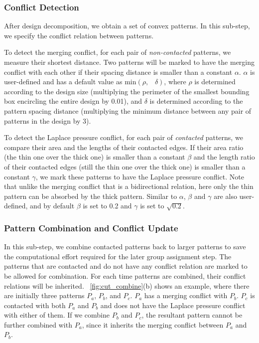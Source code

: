 \subsubsection{Conflict Detection}\label{sec:cd}

After design decomposition, we obtain a set of convex patterns.
In this sub-step, we specify the conflict relation between patterns.

To detect the merging conflict,
for each pair of \textit{non-contacted} patterns,
we measure their shortest distance.
Two patterns will be marked to have the merging conflict with each other
if their spacing distance is smaller than a constant $\alpha$.
$\alpha$ is user-defined and has a default value as 
$\text{min}(\rho,\;\;\; \delta)$,
where $\rho$ is determined according to the design size
(multiplying the perimeter of the smallest bounding box encircling the entire design by 0.01),
and $\delta$ is determined according to the pattern spacing distance
(multiplying the minimum distance between any pair of patterns in the design by 3).

To detect the Laplace pressure conflict,
for each pair of \textit{contacted} patterns,
we compare their area and the lengths of their contacted edges.
If their area ratio (the thin one over the thick one)
is smaller than a constant $\beta$ and the length ratio of their contacted edges (still the thin one over the thick one)
is smaller than a constant $\gamma$,
we mark these patterns to have the Laplace pressure conflict.
Note that unlike the merging conflict that is a bidirectional relation,
here only the thin pattern can be absorbed by the thick pattern.
Similar to $\alpha$, $\beta$ and $\gamma$ are also user-defined,
and by default $\beta$ is set to 0.2 and $\gamma$ is set to $\sqrt{0.2}$.

\subsubsection{Pattern Combination and Conflict Update}

In this sub-step, we combine contacted patterns back to larger patterns to save the computational effort required for the later group assignment step.
The patterns that are contacted and do not have any conflict relation are marked to be allowed for combination.
For each time patterns are combined,
their conflict relations will be inherited.
\figurename~\ref{fig:cut_combine}(b) shows an example,
where there are initially three patterns $P_a$, $P_b$, and $P_c$.
$P_a$ has a merging conflict with $P_b$.
$P_c$ is contacted with both $P_a$ and $P_b$
and does not have the Laplace pressure conflict with either of them.
If we combine $P_b$ and $P_c$,
the resultant pattern cannot be further combined with $P_a$,
since it inherits the merging conflict between $P_a$ and $P_b$.

